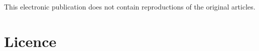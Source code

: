 \documentclass[officiallayout]{unihelcompling}
\newif\ifprintversion
\begin{document}












\else
This electronic publication does not contain reproductions of the original
articles.
\fi

\section{Licence}
\label{appendix:licence}
\ifprintversion



\else



\fi
\end{document}

